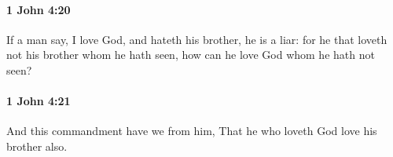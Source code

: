 		\paragraph{1 John 4:20} %
			\label{1JOHN-4-20}

			If a man say, I love God, and hateth his brother, he is a liar: for he that loveth not his brother whom he hath seen, how can he love God whom he hath not seen?

			\begin{framed}
			\scriptsize
				\begin{compactdesc}
					\item[SBLG] 
				\end{compactdesc}
			\end{framed}

		\paragraph{1 John 4:21} %
			\label{1JOHN-4-21}

			And this commandment have we from him, That he who loveth God love his brother also.

